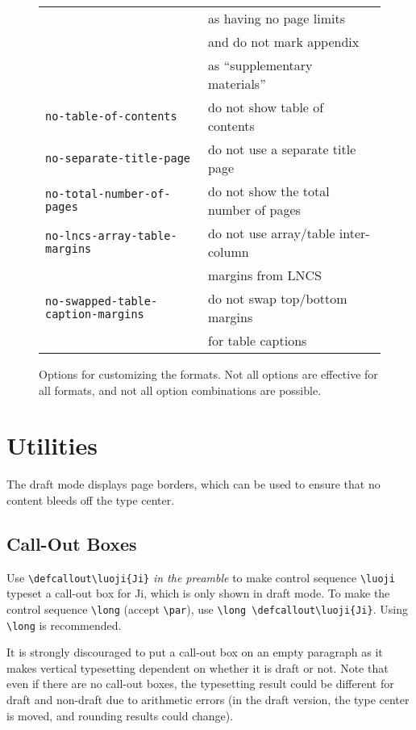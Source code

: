 \begin{figure}
\begin{tabular}{ll}
& \qquad as having no page limits \\
& \quad and do not mark appendix \\
& \qquad as ``supplementary materials'' \\
\texttt{no-table-of-contents} & do not show table of contents \\
\texttt{no-separate-title-page} & do not use a separate title page \\
\texttt{no-total-number-of-pages} & do not show the total number of pages \\
\texttt{no-lncs-array-table-margins} & do not use array/table inter-column \\
& \qquad margins from LNCS \\
\texttt{no-swapped-table-caption-margins} &
do not swap top/bottom margins \\
& \qquad for table captions \\
\bottomrule
\end{tabular}
\caption{Options for customizing the formats.
Not all options are effective for all formats, and
not all option combinations are possible.}
\label{fig:figure1}
\end{figure}

\section{Utilities}

The draft mode displays page borders,
which can be used to ensure that no content bleeds off the type center.

\subsection{Call-Out Boxes}

Use
\texttt{\textbackslash defcallout\textbackslash luoji\{Ji\}}
\emph{in the preamble}
to make
control sequence \texttt{\textbackslash luoji} typeset a call-out box for Ji,
which is only shown in draft mode.
To make the control sequence
\texttt{\textbackslash long} (accept \texttt{\textbackslash par}),
use
\texttt{\textbackslash long%
\textbackslash defcallout\textbackslash luoji\{Ji\}}.
Using \texttt{\textbackslash long} is recommended.


It is strongly discouraged to put a call-out box on an empty paragraph
as it makes vertical typesetting dependent on whether it is draft or not.
Note that even if there are no call-out boxes,
the typesetting result could be different for draft and non-draft
due to arithmetic errors
(in the draft version,
the type center is moved, and
rounding results could change).

